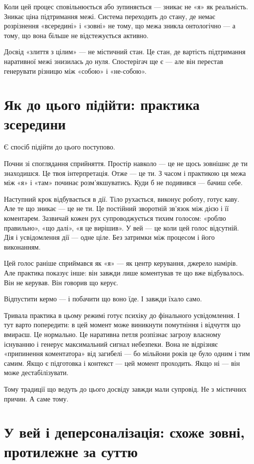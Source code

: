 \documentclass[12pt, a4paper, openany]{book}
\begin{document}
Коли цей процес сповільнюється або зупиняється — зникає не «я» як реальність. Зникає ціна підтримання межі. Система переходить до стану, де немає розрізнення «всередині» і «зовні» не тому, що межа зникла онтологічно — а тому, що вона більше не відстежується активно.

Досвід «злиття з цілим» — не містичний стан. Це стан, де вартість підтримання наративної межі знизилась до нуля. Спостерігач ще є — але він перестав генерувати різницю між «собою» і «не-собою».


\section{Як до цього підійти: практика зсередини}

Є спосіб підійти до цього поступово.

Почни зі споглядання сприйняття. Простір навколо --- це не щось зовнішнє де ти знаходишся. Це твоя інтерпретація. Отже --- це ти. З часом і практикою ця межа між «я» і «там» починає розм'якшуватись. Куди б не подивився --- бачиш себе.

Наступний крок відбувається в дії. Тіло рухається, виконує роботу, готує каву. Але те що зникає --- це не ти. Це постійний зворотній зв'язок між дією і її коментарем. Зазвичай кожен рух супроводжується тихим голосом: «роблю правильно», «що далі», «я це вирішив». У вей --- це коли цей голос відсутній. Дія і усвідомлення дії --- одне ціле. Без затримки між процесом і його виконанням.

Цей голос раніше сприймався як «я» --- як центр керування, джерело намірів. Але практика показує інше: він завжди лише коментував те що вже відбувалось. Він не керував. Він говорив що керує.

Відпустити кермо --- і побачити що воно їде. І завжди їхало само.

Тривала практика в цьому режимі готує психіку до фінального усвідомлення. І тут варто попередити: в цей момент може виникнути помутніння і відчуття що вмираєш. Це нормально. Це наративна петля розпізнає загрозу власному існуванню і генерує максимальний сигнал небезпеки. Вона не відрізняє «припинення коментатора» від загибелі --- бо мільйони років це було одним і тим самим. Якщо є підготовка і контекст --- цей момент проходить. Якщо ні --- він може дестабілізувати.

Тому традиції що ведуть до цього досвіду завжди мали супровід. Не з містичних причин. А саме тому.

\section{У вей і деперсоналізація: схоже зовні, протилежне за суттю}
\end{document}
